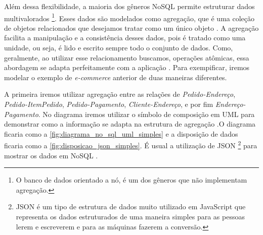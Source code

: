 Além dessa flexibilidade, a maioria dos gêneros NoSQL permite estruturar dados multivalorados \footnote{O banco de dados orientado a nó, é um dos gêneros que não implementam agregação.}. Esses dados são modelados como agregação, que é uma coleção de objetos relacionados que desejamos tratar como um único objeto \cite{domain-driven}. A agregação facilita a manipulação e a consistência desses dados, pois é tratado como uma unidade, ou seja, é lido e escrito sempre todo o conjunto de dados. Como, geralmente, ao utilizar esse relacionamento buscamos, operações atômicas, essa abordagem se adapta perfeitamente com a aplicação \cite{NoSQL}. Para exempificar, iremos modelar o exemplo de
\textit{e-commerce} anterior de duas maneiras diferentes.

A primeira iremos utilizar agregação entre as relações de \textit{Pedido-Endereço}, \textit{Pedido-ItemPedido}, \textit{Pedido-Pagamento}, \textit{Cliente-Endereço}, e por fim \textit{Endereço-Pagamento}. No diagrama iremos utilizar o símbolo de composição em \ac{UML} para demonstrar como a informação se adapta na estrutura de agregação \cite{NoSQL}.O diagrama ficaria como a \autoref{fig:diagrama_no_sql_uml_simples} e a disposição de dados ficaria como a \autoref{fig:disposicao_json_simples}. É usual a utilização de JSON \footnote{JSON é um tipo de estrutura de dados muito utilizado em JavaScript que representa os dados estruturados de uma maneira simples para as pessoas lerem e escreverem e para as máquinas fazerem a conversão.} para mostrar os dados em NoSQL \cite{NoSQL}.


